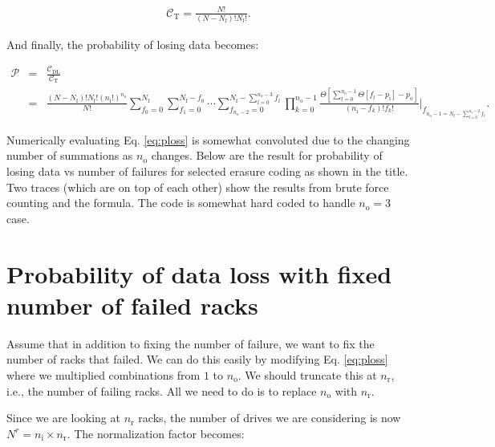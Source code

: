\documentclass[journal]{IEEEtran}
\begin{document}
\begin{eqnarray}
\mathcal{C}_\text{T}=\frac{N!}{(N-N_\text{f})!N_\text{f}!}.
\label{eq:pb0}
\end{eqnarray}

And finally, the probability of losing data becomes:

\begin{eqnarray}
\mathcal{P}&=&\frac{\mathcal{C}_\text{DL}}{\mathcal{C}_\text{T}}\nonumber\\
&=& \frac{(N-N_\text{f})!N_\text{f}! \left(n_\text{i}!\right)^{n_\text{o}}}{ N!}  \sum_{f_0=0}^{N_\text{f}}\sum_{f_1=0}^{N_\text{f}-f_0}\cdots \sum_{f_{n_\text{o}-2}=0}^{N_\text{f}-\sum_{l=0}^{n_\text{o}-3}f_l} {\displaystyle \prod_{k=0}^{n_\text{o}-1}} \frac{\Theta\left[  \sum_{l=0}^{n_\text{o}-1}  \Theta \left[f_l-p_\text{i} \right]-p_\text{o}     \right]}{(n_\text{i}-f_k)!f_k!}\bigg\rvert_{f_{ n_\text{o}-1=N_\text{f}-\sum_{l=0}^{n_\text{o}-2}f_l}}.
\label{eq:ploss}
\end{eqnarray}

Numerically evaluating Eq. \eqref{eq:ploss} is somewhat convoluted due to the changing number of summations as \(n_\text{o}\) changes. Below are the result for probability of losing data vs number of failures for selected erasure coding as shown in the title. Two traces (which are on top of each other) show the results from brute force counting and the formula. The code is somewhat hard coded to handle \(n_\text{o}=3\) case.

\hypertarget{probability-of-data-loss-with-fixed-number-of-failed-racks}{%
\section{Probability of data loss with fixed number of failed racks}\label{probability-of-data-loss-with-fixed-number-of-failed-racks}}

Assume that in addition to fixing the number of failure, we want to fix the number of racks that failed. We can do this easily by modifying Eq. \eqref{eq:ploss} where we multiplied combinations from \(1\) to \(n_\text{o}\). We should truncate this at \(n_\text{r}\), i.e., the number of failing racks. All we need to do is to replace \(n_\text{o}\) with \(n_\text{r}\).

Since we are looking at \(n_\text{r}\) racks, the number of drives we are considering is now \(N^r=n_\text{i}\times n_\text{r}\). The normalization factor becomes:
\end{document}
